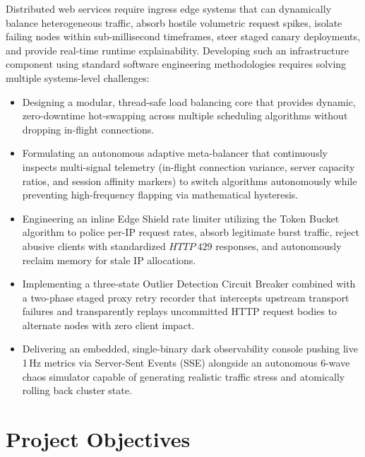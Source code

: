 \documentclass[12pt,openany]{report}
\begin{document}
Distributed web services require ingress edge systems that can dynamically balance heterogeneous traffic, absorb hostile volumetric request spikes, isolate failing nodes within sub-millisecond timeframes, steer staged canary deployments, and provide real-time runtime explainability. Developing such an infrastructure component using standard software engineering methodologies requires solving multiple systems-level challenges:
\begin{itemize}
  \item Designing a modular, thread-safe load balancing core that provides dynamic, zero-downtime hot-swapping across multiple scheduling algorithms without dropping in-flight connections.
  \item Formulating an autonomous adaptive meta-balancer that continuously inspects multi-signal telemetry (in-flight connection variance, server capacity ratios, and session affinity markers) to switch algorithms autonomously while preventing high-frequency flapping via mathematical hysteresis.
  \item Engineering an inline Edge Shield rate limiter utilizing the Token Bucket algorithm to police per-IP request rates, absorb legitimate burst traffic, reject abusive clients with standardized $HTTP~429$ responses, and autonomously reclaim memory for stale IP allocations.
  \item Implementing a three-state Outlier Detection Circuit Breaker combined with a two-phase staged proxy retry recorder that intercepts upstream transport failures and transparently replays uncommitted HTTP request bodies to alternate nodes with zero client impact.
  \item Delivering an embedded, single-binary dark observability console pushing live 1\,Hz metrics via Server-Sent Events (SSE) alongside an autonomous 6-wave chaos simulator capable of generating realistic traffic stress and atomically rolling back cluster state.
\end{itemize}

\section{Project Objectives}
\end{document}
